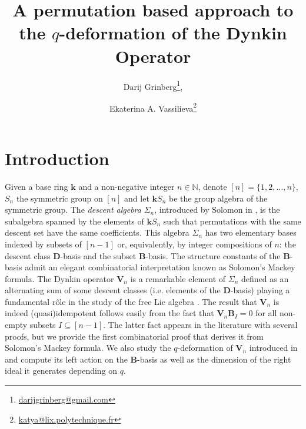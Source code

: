 \documentclass[revision]{FPSAC2025}
\title{A permutation based approach to the $q$-deformation of the Dynkin Operator}
\author[D. Grinberg \and E.A. Vassilieva]{Darij Grinberg\thanks{\href{mailto:darijgrinberg@gmail.com}{darijgrinberg@gmail.com}}\addressmark{1}, \and Ekaterina A. Vassilieva\thanks{\href{mailto:katya@lix.polytechnique.fr}{katya@lix.polytechnique.fr}}\addressmark{2}}
\begin{document}
\maketitle


\section{Introduction}
Given a base ring $\mathbf{k}$ and a non-negative integer $n \in \mathbb{N}$, denote $[n]=\{1, 2, \dots, n\}$,  $S_n$ the symmetric group on $[n]$ and let $\mathbf{k}S_n$ be the group algebra of the symmetric group.
The \emph{descent algebra} $\Sigma_n$, introduced by Solomon in \cite{Sol76}, is the subalgebra spanned by the elements of  $\mathbf{k}S_n$ such that permutations with the same descent set have the same coefficients.
This algebra $\Sigma_n$ has two elementary bases indexed by subsets of $[n-1]$ or, equivalently, by integer compositions of $n$: the descent class $\mathbf{D}$-basis and the subset $\mathbf{B}$-basis.
The structure constants of the $\mathbf{B}$-basis admit an elegant combinatorial interpretation %
known as Solomon's Mackey formula.
The Dynkin operator $\mathbf{V}_n$ is a remarkable element of $\Sigma_n$ defined as an alternating sum of some descent classes (i.e. elements of the $\mathbf{D}$-basis) playing a fundamental rôle in the study of the free Lie algebra \cite[(8.4.2)]{Reutenauer1993}.
The result that $\mathbf{V}_n$ is indeed (quasi)idempotent follows easily from the fact that $\mathbf{V}_n \mathbf{B}_I = 0$ for all non-empty subsets $I \subseteq [n-1]$.
The latter fact appears in the literature with several proofs, but we provide the first combinatorial proof that derives it from Solomon's Mackey formula.
We also study the $q$-deformation of $\mathbf{V}_n$ introduced in \cite{CalderbankHanlonSundaram94} and compute its left action on the $\mathbf{B}$-basis
as well as the dimension of the right ideal it generates depending on $q$.
\end{document}
